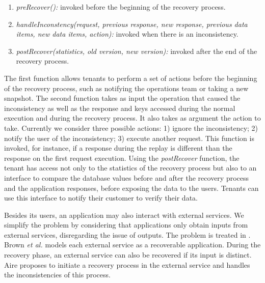 \begin{enumerate}
  \item \textit{preRecover():} invoked before the beginning of the recovery process.
  \item \textit{handleInconstency(request, previous response, new response, previous data items, new data items, action):} invoked when there is an inconsistency.
  \item \textit{postRecover(statistics, old version, new version):} invoked after the end of the recovery process.
\end{enumerate}

The first function allows tenants to perform a set of actions before the beginning of the recovery process, such as notifying the operations team or taking a new snapshot. 
The second function takes as input the operation that caused the inconsistency as well as the response and keys accessed during the normal execution and during the recovery process. It also takes as argument the action to take. Currently we consider three possible actions: 1) ignore the inconsistency; 2) notify the user of the inconsistency; 3) execute another request. This function is invoked, for instance, if a response during the replay is different than the response on the first request execution.
Using the \textit{postRecover} function, the tenant has access not only to the statistics of the recovery process but also to an interface to compare the database values before and after the recovery process and the application responses, before exposing the data to the users. 
Tenants can use this interface to notify their customer to verify their data.

Besides its users, an application may also interact with external services. We simplify the problem by considering that applications only obtain inputs from external services, disregarding the issue of outputs. The problem is treated in \cite{undoForOperators,aire}. Brown \textit{et al.} \cite{Brown_spheres} models each external service as a recoverable application. During the recovery phase, an external service can also be recovered if its input is distinct. Aire \cite{aire} proposes to initiate a recovery process in the external service and handles the inconsistencies of this process.



